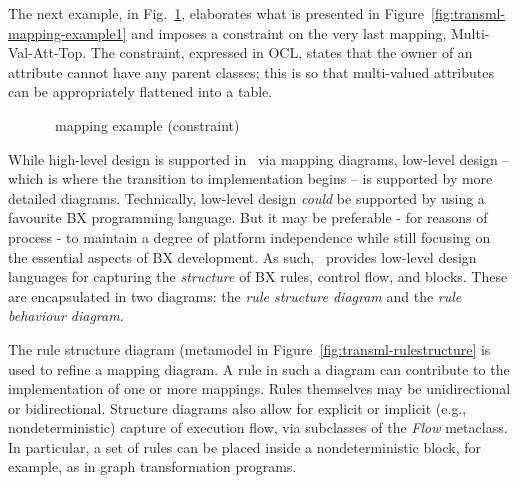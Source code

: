 The next example, in Fig.~\ref{fig:mapping-example3}, elaborates what is presented in Figure~\ref{fig:transml-mapping-example1} and imposes a constraint on the very last mapping, Multi-Val-Att-Top. The constraint, expressed in OCL, states that the owner of an attribute cannot have any parent classes; this is so that multi-valued attributes can be appropriately flattened into a table.

\begin{figure}[htbp]
\caption{\transml\ mapping example (constraint)}
\label{fig:mapping-example3}
\end{figure}

While high-level design is supported in \transml\ via mapping diagrams, low-level design -- which is where the transition to implementation begins -- is
supported by more detailed diagrams. Technically, low-level design \textit{could} be supported by using a favourite BX programming language. But it may be preferable - for reasons of process - to maintain a degree of platform independence while still focusing on the essential aspects of BX development. As such, \transml\ provides low-level design languages for capturing the \textit{structure} of BX rules, control flow, and blocks. These are encapsulated in two diagrams: the \textit{rule structure diagram} and the \textit{rule behaviour diagram}.

The rule structure diagram (metamodel in Figure~\ref{fig:transml-rulestructure} is used to refine a mapping diagram. A rule in such a diagram can contribute to the implementation of one or more mappings. Rules themselves may be unidirectional or bidirectional. Structure diagrams also allow for explicit or implicit (e.g., nondeterministic) capture of execution flow, via subclasses of the \textit{Flow} metaclass. In particular, a set of rules can be placed inside a nondeterministic block, for example, as in graph transformation programs.

